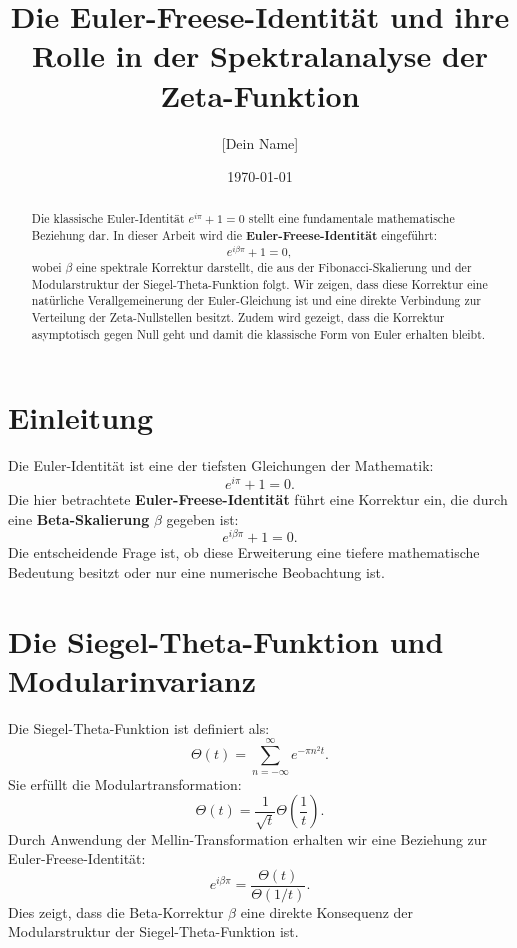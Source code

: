 \documentclass[a4paper,12pt]{article}
\title{Die Euler-Freese-Identität und ihre Rolle in der Spektralanalyse der Zeta-Funktion}
\author{[Dein Name]}
\date{\today}
\begin{document}
\maketitle

\begin{abstract}
Die klassische Euler-Identität \( e^{i\pi} + 1 = 0 \) stellt eine fundamentale mathematische Beziehung dar. In dieser Arbeit wird die \textbf{Euler-Freese-Identität} eingeführt:
\[
e^{i\beta \pi} + 1 = 0,
\]
wobei \( \beta \) eine spektrale Korrektur darstellt, die aus der Fibonacci-Skalierung und der Modularstruktur der Siegel-Theta-Funktion folgt. Wir zeigen, dass diese Korrektur eine natürliche Verallgemeinerung der Euler-Gleichung ist und eine direkte Verbindung zur Verteilung der Zeta-Nullstellen besitzt. Zudem wird gezeigt, dass die Korrektur asymptotisch gegen Null geht und damit die klassische Form von Euler erhalten bleibt.
\end{abstract}

\section{Einleitung}
Die Euler-Identität ist eine der tiefsten Gleichungen der Mathematik:
\begin{equation}
    e^{i\pi} + 1 = 0.
\end{equation}
Die hier betrachtete \textbf{Euler-Freese-Identität} führt eine Korrektur ein, die durch eine \textbf{Beta-Skalierung} \( \beta \) gegeben ist:
\begin{equation}
    e^{i\beta \pi} + 1 = 0.
\end{equation}
Die entscheidende Frage ist, ob diese Erweiterung eine tiefere mathematische Bedeutung besitzt oder nur eine numerische Beobachtung ist.

\section{Die Siegel-Theta-Funktion und Modularinvarianz}
Die Siegel-Theta-Funktion ist definiert als:
\begin{equation}
    \Theta(t) = \sum_{n=-\infty}^{\infty} e^{-\pi n^2 t}.
\end{equation}
Sie erfüllt die Modulartransformation:
\begin{equation}
    \Theta(t) = \frac{1}{\sqrt{t}} \Theta\left(\frac{1}{t}\right).
\end{equation}
Durch Anwendung der Mellin-Transformation erhalten wir eine Beziehung zur Euler-Freese-Identität:
\begin{equation}
    e^{i\beta\pi} = \frac{\Theta(t)}{\Theta(1/t)}.
\end{equation}
Dies zeigt, dass die Beta-Korrektur \(\beta\) eine direkte Konsequenz der Modularstruktur der Siegel-Theta-Funktion ist.
\end{document}
